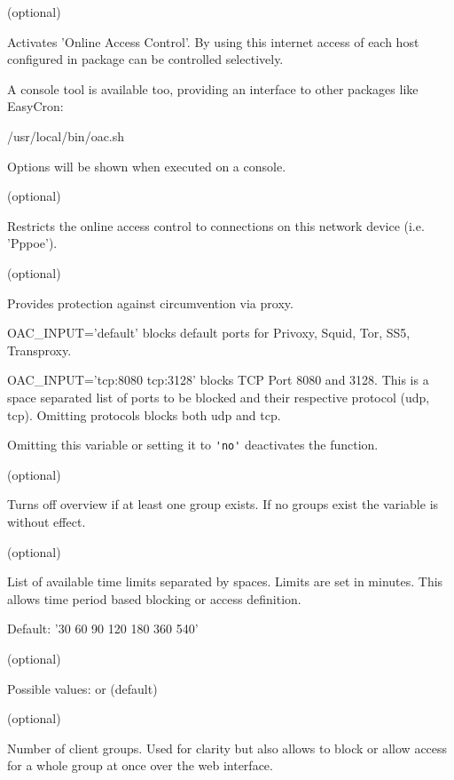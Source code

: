 \begin{description}

 (optional)
 
    Activates 'Online Access Control'. By using this internet access of each host 
    configured in package  can be controlled selectively.

    A console tool is available too, providing an interface to other
    packages like EasyCron:

    /usr/local/bin/oac.sh

    Options will be shown when executed on a console.

 (optional)

    Restricts the online access control to connections on this
    network device (i.e. 'Pppoe').

 (optional)

    Provides protection against circumvention via proxy.
    
    OAC\_INPUT='default' blocks default ports for Privoxy, Squid, Tor, SS5, Transproxy.
    
    OAC\_INPUT='tcp:8080 tcp:3128' blocks TCP Port 8080 and 3128.
    This is a space separated list of ports to be blocked and their respective 
    protocol (udp, tcp). Omitting protocols blocks both udp and tcp.
    
    Omitting this variable or setting it to \verb*?'no'? deactivates the function.

 (optional)

    Turns off overview if at least one group exists. If no groups exist the 
    variable is without effect.
    
 (optional)

    List of available time limits separated by spaces. Limits are set in minutes. 
    This allows time period based blocking or access definition.

    Default: '30 60 90 120 180 360 540'
    
 (optional)

    Possible values:  or  (default)

 (optional)

    Number of client groups. Used for clarity but also allows to block or allow 
    access for a whole group at once over the web interface.


\end{description}
